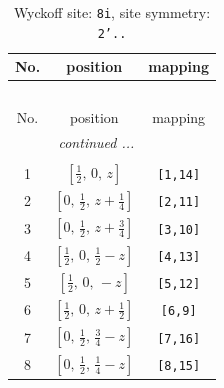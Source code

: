\documentclass[fleqn,8pt]{jsarticle}
\begin{document}
\begin{longtable}{ccc}
\caption{Wyckoff site: {\tt 8i}, site symmetry: {\tt 2'..}}
 \\
 \hline \hline
No. & position & mapping \\ \hline \endfirsthead

\multicolumn{2}{l}{\tablename\ \thetable{}} \\
 \hline \hline
No. & position & mapping \\ \hline \endhead

 \hline \hline
\multicolumn{2}{r}{\footnotesize\it continued ...} \\ \endfoot

 \hline \hline
\multicolumn{2}{r}{} \\ \endlastfoot

1 & $\left[ \frac{1}{2},\, 0,\, z \right]$ & {\tt [1,14]} \\ \hline
2 & $\left[ 0,\, \frac{1}{2},\, z + \frac{1}{4} \right]$ & {\tt [2,11]} \\ \hline
3 & $\left[ 0,\, \frac{1}{2},\, z + \frac{3}{4} \right]$ & {\tt [3,10]} \\ \hline
4 & $\left[ \frac{1}{2},\, 0,\, \frac{1}{2} - z \right]$ & {\tt [4,13]} \\ \hline
5 & $\left[ \frac{1}{2},\, 0,\, - z \right]$ & {\tt [5,12]} \\ \hline
6 & $\left[ \frac{1}{2},\, 0,\, z + \frac{1}{2} \right]$ & {\tt [6,9]} \\ \hline
7 & $\left[ 0,\, \frac{1}{2},\, \frac{3}{4} - z \right]$ & {\tt [7,16]} \\ \hline
8 & $\left[ 0,\, \frac{1}{2},\, \frac{1}{4} - z \right]$ & {\tt [8,15]} \\
\end{longtable}
\renewcommand{\arraystretch}{1.2}
\end{document}
